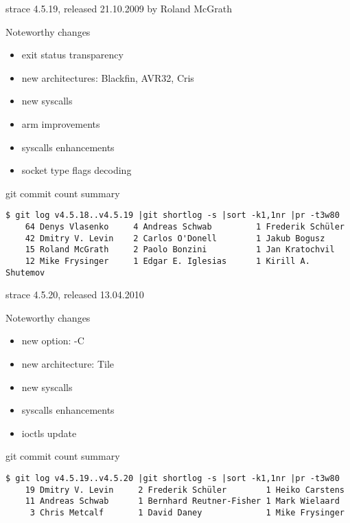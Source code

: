 \documentclass[unicode]{beamer}
\begin{document}
\begin{frame}[fragile]{strace 4.5.19, released 21.10.2009 by Roland McGrath}
	\begin{block}{Noteworthy changes}
	\begin{itemize}
		\item exit status transparency
		\item new architectures: Blackfin, AVR32, Cris
		\item new syscalls
		\item arm improvements
		\item syscalls enhancements
		\item socket type flags decoding
	\end{itemize}
	\end{block}
	\begin{block}{git commit count summary}
	\scriptsize
\begin{verbatim}
$ git log v4.5.18..v4.5.19 |git shortlog -s |sort -k1,1nr |pr -t3w80
    64 Denys Vlasenko     4 Andreas Schwab         1 Frederik Schüler
    42 Dmitry V. Levin    2 Carlos O'Donell        1 Jakub Bogusz
    15 Roland McGrath     2 Paolo Bonzini          1 Jan Kratochvil
    12 Mike Frysinger     1 Edgar E. Iglesias      1 Kirill A. Shutemov
\end{verbatim}
	\end{block}
\end{frame}

\begin{frame}[fragile]{strace 4.5.20, released 13.04.2010}
	\begin{block}{Noteworthy changes}
	\begin{itemize}
		\item new option: -C
		\item new architecture: Tile
		\item new syscalls
		\item syscalls enhancements
		\item ioctls update
	\end{itemize}
	\end{block}
	\begin{block}{git commit count summary}
	\scriptsize
\begin{verbatim}
$ git log v4.5.19..v4.5.20 |git shortlog -s |sort -k1,1nr |pr -t3w80
    19 Dmitry V. Levin     2 Frederik Schüler        1 Heiko Carstens
    11 Andreas Schwab      1 Bernhard Reutner-Fisher 1 Mark Wielaard
     3 Chris Metcalf       1 David Daney             1 Mike Frysinger
\end{verbatim}
	\end{block}
\end{frame}
\end{document}
